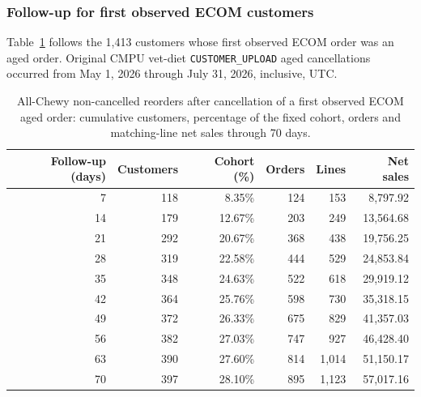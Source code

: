 \clearpage
\subsubsection{Follow-up for first observed ECOM customers}
Table~\ref{tab:financial-opportunity-new-chewy-all-chewy} follows the
1,413 customers whose first observed ECOM order was an aged order. Original CMPU vet-diet
\texttt{CUSTOMER\_UPLOAD} aged cancellations occurred from
May 1, 2026 through July 31, 2026, inclusive, UTC.

\begin{table}[!htbp]
\centering
\caption{All-Chewy non-cancelled reorders after cancellation of a first observed ECOM aged order: cumulative customers, percentage of the fixed cohort, orders and matching-line net sales through 70 days.}
\label{tab:financial-opportunity-new-chewy-all-chewy}
\begin{tabular}{@{}rrrrrr@{}}
\toprule
Follow-up (days) & Customers & Cohort (\%) & Orders & Lines & Net sales \\
\midrule
7 & 118 & 8.35\% & 124 & 153 & 8,797.92 \\
14 & 179 & 12.67\% & 203 & 249 & 13,564.68 \\
21 & 292 & 20.67\% & 368 & 438 & 19,756.25 \\
28 & 319 & 22.58\% & 444 & 529 & 24,853.84 \\
35 & 348 & 24.63\% & 522 & 618 & 29,919.12 \\
42 & 364 & 25.76\% & 598 & 730 & 35,318.15 \\
49 & 372 & 26.33\% & 675 & 829 & 41,357.03 \\
56 & 382 & 27.03\% & 747 & 927 & 46,428.40 \\
63 & 390 & 27.60\% & 814 & 1,014 & 51,150.17 \\
70 & 397 & 28.10\% & 895 & 1,123 & 57,017.16 \\
\bottomrule
\end{tabular}


\end{table}
